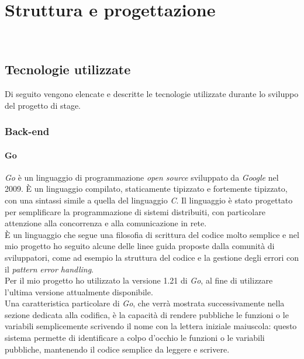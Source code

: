 \chapter{Struttura e progettazione}
\label{cap:struttura-progettazione}

\\

\section{Tecnologie utilizzate}

Di seguito vengono elencate e descritte le tecnologie utilizzate durante lo sviluppo del
progetto di stage.

\subsection{Back-end}

\subsubsection*{Go}

\emph{Go} è un linguaggio di programmazione \emph{open source} sviluppato da
\emph{Google} nel 2009. È un linguaggio compilato, staticamente tipizzato e
fortemente tipizzato, con una sintassi simile a quella del linguaggio \emph{C}.
Il linguaggio è stato progettato per semplificare la programmazione di sistemi
distribuiti, con particolare attenzione alla concorrenza e alla
comunicazione in rete. \\
È un linguaggio che segue una filosofia di scrittura del codice molto semplice e
nel mio progetto ho seguito alcune delle linee guida proposte dalla comunità di
sviluppatori, come ad esempio la struttura del codice e la gestione degli errori
con il \emph{pattern} \emph{error handling}. \\
Per il mio progetto ho utilizzato la versione 1.21 di \emph{Go}, al fine di
utilizzare l'ultima versione attualmente disponibile.\\
Una caratteristica particolare di \emph{Go}, che verrà mostrata successivamente
nella sezione dedicata alla codifica, è la capacità di rendere pubbliche le
funzioni o le variabili semplicemente scrivendo il nome con la lettera iniziale
maiuscola: questo sistema permette di identificare a colpo d'occhio le funzioni
o le variabili pubbliche, mantenendo il codice semplice da leggere e scrivere. \cite{go}

